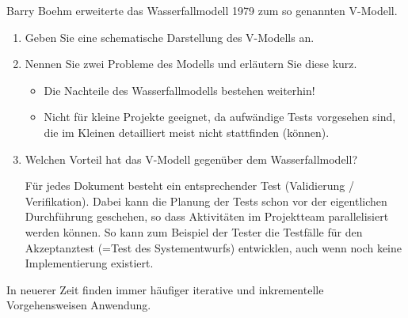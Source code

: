 \documentclass{bschlangaul-aufgabe}
\begin{document}
\noindent
Barry Boehm erweiterte das Wasserfallmodell 1979 zum so genannten
V-Modell.

\begin{enumerate}


\item Geben Sie eine schematische Darstellung des
V-Modells an.


\item Nennen Sie zwei Probleme des Modells und erläutern Sie diese kurz.

\begin{bAntwort}
\begin{itemize}
\item Die Nachteile des Wasserfallmodells bestehen weiterhin!

\item Nicht für kleine Projekte geeignet, da aufwändige Tests vorgesehen
sind, die im Kleinen detailliert meist nicht stattfinden (können).
\end{itemize}
\end{bAntwort}


\item Welchen Vorteil hat das V-Modell gegenüber dem Wasserfallmodell?

\begin{bAntwort}
Für jedes Dokument besteht ein entsprechender Test (Validierung /
Verifikation). Dabei kann die Planung der Tests schon vor der
eigentlichen Durchführung geschehen, so dass Aktivitäten im Projektteam
parallelisiert werden können. So kann zum Beispiel der Tester die
Testfälle für den Akzeptanztest (=Test des Systementwurfs) entwicklen,
auch wenn noch keine Implementierung existiert.
\end{bAntwort}

\end{enumerate}

\noindent
In neuerer Zeit finden immer häufiger iterative und inkrementelle
Vorgehensweisen Anwendung.
\end{document}
